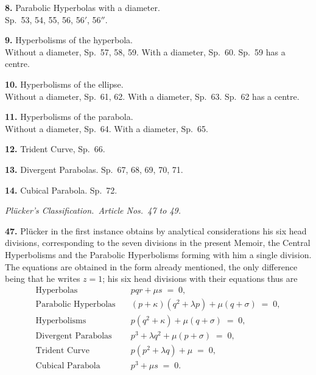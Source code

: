 \documentclass[11pt,a4paper]{article}
\begin{document}
\noindent\textbf{8.} Parabolic Hyperbolas with a diameter. \\
\quad Sp.\ 53, 54, 55, 56, 56$'$, 56$''$.

\smallskip

\noindent\textbf{9.} Hyperbolisms of the hyperbola. \\
\quad Without a diameter, Sp.\ 57, 58, 59. With a diameter, Sp.\ 60. Sp.\ 59 has a centre.

\smallskip

\noindent\textbf{10.} Hyperbolisms of the ellipse. \\
\quad Without a diameter, Sp.\ 61, 62. With a diameter, Sp.\ 63. Sp.\ 62 has a centre.

\smallskip

\noindent\textbf{11.} Hyperbolisms of the parabola. \\
\quad Without a diameter, Sp.\ 64. With a diameter, Sp.\ 65.

\smallskip

\noindent\textbf{12.} Trident Curve, Sp.\ 66.

\smallskip

\noindent\textbf{13.} Divergent Parabolas. Sp.\ 67, 68, 69, 70, 71.

\smallskip

\noindent\textbf{14.} Cubical Parabola. Sp.\ 72.

\medskip

\noindent\textit{Pl\"ucker's Classification.\ Article Nos.\ 47 to 49.}

\medskip

\textbf{47.} Pl\"ucker in the first instance obtains by analytical considerations his six head divisions, corresponding to the seven divisions in the present Memoir, the Central Hyperbolisms and the Parabolic Hyperbolisms forming with him a single division. The equations are obtained in the form already mentioned, the only difference being that he writes $z=1$; his six head divisions with their equations thus are
\begin{align*}
\text{Hyperbolas}\quad& pqr + \mu s \;=\; 0,\\
\text{Parabolic Hyperbolas}\quad& (p+\kappa)(q^{2}+\lambda p) + \mu(q+\sigma) \;=\; 0,\\
\text{Hyperbolisms}\quad& p(q^{2}+\kappa) + \mu(q+\sigma) \;=\; 0,\\
\text{Divergent Parabolas}\quad& p^{3} + \lambda q^{2} + \mu(p+\sigma) \;=\; 0,\\
\text{Trident Curve}\quad& p(p^{2}+\lambda q) + \mu \;=\; 0,\\
\text{Cubical Parabola}\quad& p^{3} + \mu s \;=\; 0.
\end{align*}
\end{document}
